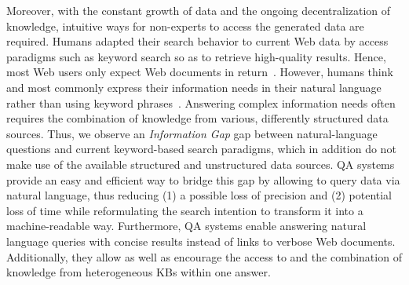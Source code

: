 Moreover, with the constant growth of data and the ongoing decentralization of knowledge, intuitive ways for non-experts to access the generated data are required. 
Humans adapted their search behavior to current Web data by access paradigms such as keyword search so as to retrieve high-quality results.
Hence, most Web users only expect Web documents in return~\cite{ilprints361}.
However, humans think and most commonly express their information needs  in their natural language rather than using keyword phrases~\cite{woods1973progress}. 
Answering complex information needs often requires the combination of knowledge from various, differently structured data sources.
Thus, we observe an \emph{Information Gap} gap between natural-language questions and current keyword-based search paradigms, which in addition do not make use of the available structured and unstructured data sources.
\ac{QA} systems provide an easy and efficient way to bridge this gap by allowing to query data via natural language, thus reducing (1) a possible loss of precision and (2) potential loss of time while reformulating the search intention to transform it into a machine-readable way.
Furthermore, QA systems enable answering natural language queries with concise results instead of  links to verbose Web documents. 
Additionally, they allow as well as encourage the access  to and the combination of knowledge from heterogeneous \ac{KB}s within one answer.

